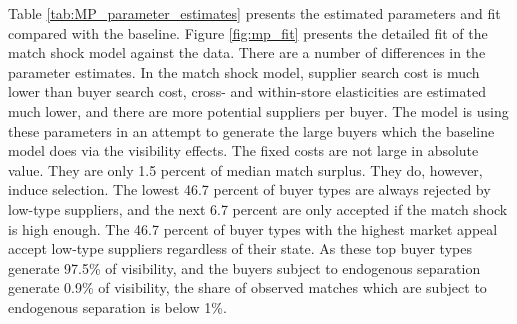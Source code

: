 \documentclass[12pt]{article} \usepackage{amsmath,amssymb,amsthm,geometry,graphicx,setspace,algorithm,algpseudocode,float}
\begin{document}
Table \ref{tab:MP_parameter_estimates} presents the estimated parameters and fit compared with the baseline. Figure \ref{fig:mp_fit} presents the detailed fit of the match shock model against the data. There are a number of differences in the parameter estimates. In the match shock model, supplier search cost is much lower than buyer search cost, cross- and within-store elasticities are estimated much lower, and there are more potential suppliers per buyer.  The model is using these parameters in an attempt to generate the large buyers which the baseline model does via the visibility effects.  The fixed costs are not large in absolute value.  They are only 1.5 percent of median match surplus. They do, however, induce selection.  The lowest 46.7 percent of buyer types are always rejected by low-type suppliers, and the next 6.7 percent are only accepted if the match shock is high enough.  The 46.7 percent of buyer types with the highest market appeal accept low-type suppliers regardless of their state.  As these top buyer types generate 97.5\% of visibility, and the buyers subject to endogenous separation generate 0.9\% of visibility, the share of observed matches which are subject to endogenous separation is below 1\%.
\end{document}
